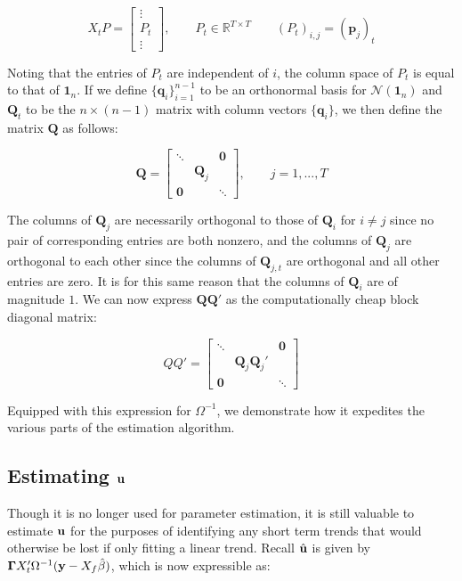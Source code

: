 $$X_tP =\left[\begin{array}{c}
    \vdots  \\
    P_t \\
    \vdots 
\end{array}\right], \qquad P_t \in \mathbb{R}^{T\times T}\qquad (P_t)_{i,j} = (\mathbf{p}_j)_t$$

Noting that the entries of $P_t$ are independent of $i$, the column space of $P_t$ is equal to that of $\mathbf{1}_n$. If we define $\{\mathbf{q}_i\}_{i=1}^{n-1}$ to be an orthonormal basis for $\mathcal{N}(\mathbf{1}_n)$ and $\mathbf{Q}_t$ to be the $n \times (n-1)$ matrix with column vectors $\{\mathbf{q}_i\}$, we then define the matrix $\mathbf{Q}$ as follows:

$$ \mathbf{Q} = \left[\begin{array}{ccc}
    \ddots &  &  \mathbf{0}\\
     & \mathbf{Q}_j & \\
    \mathbf{0} &  & \ddots
\end{array}\right], \qquad j=1,...,T   $$





The columns of $\mathbf{Q}_j$ are necessarily orthogonal to those of $\mathbf{Q}_i$ for $i\neq j$ since no pair of corresponding entries are both nonzero, and the columns of $\mathbf{Q}_j$ are orthogonal to each other since the columns of $\mathbf{Q}_{j,t}$ are orthogonal and all other entries are zero. It is for this same reason that the columns of $\mathbf{Q}_i$ are of magnitude $1$. We can now express $\mathbf{QQ'}$ as the computationally cheap block diagonal matrix:

$$ QQ' = \left[ \begin{array}{ccc}
    \ddots &  & \mathbf{0} \\
      & \mathbf{Q}_j\mathbf{Q}_j' &  \\
     \mathbf{0} & & \ddots
\end{array} \right] $$

Equipped with this expression for $\Omega^{-1}$, we demonstrate how it expedites the various parts of the estimation algorithm.

\subsection{Estimating $\mathbf{u}$}
Though it is no longer used for parameter estimation, it is still valuable to estimate $\mathbf{u}$ for the purposes of identifying any short term trends that would otherwise be lost if only fitting a linear trend. Recall $\hat{\mathbf{u}}$ is given by $\mathbf{\Gamma} X_t' \Omega^{-1}(\mathbf{y} - X_f\hat{\beta})$, which is now expressible as:

